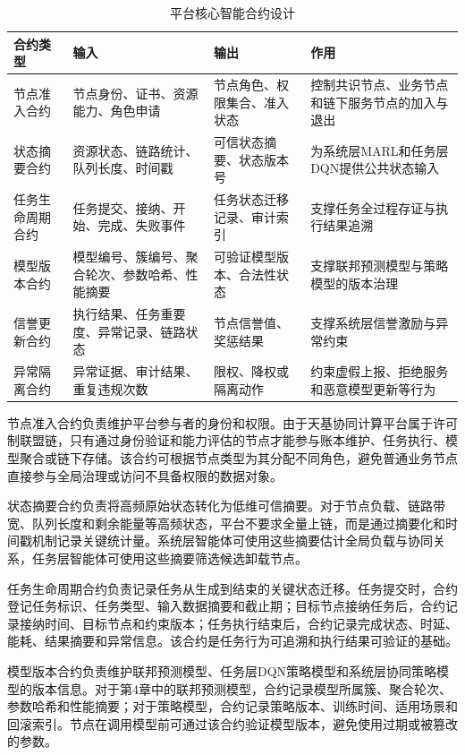 \begin{table}[htbp]
  \centering
  \caption{平台核心智能合约设计}
  \label{tab:contract_design}
  \begin{tabular}{p{2.5cm}p{3.4cm}p{3.5cm}p{3.5cm}}
    \toprule
    合约类型 & 输入 & 输出 & 作用 \\
    \midrule
    节点准入合约 & 节点身份、证书、资源能力、角色申请 & 节点角色、权限集合、准入状态 & 控制共识节点、业务节点和链下服务节点的加入与退出 \\
    状态摘要合约 & 资源状态、链路统计、队列长度、时间戳 & 可信状态摘要、状态版本号 & 为系统层MARL和任务层DQN提供公共状态输入 \\
    任务生命周期合约 & 任务提交、接纳、开始、完成、失败事件 & 任务状态迁移记录、审计索引 & 支撑任务全过程存证与执行结果追溯 \\
    模型版本合约 & 模型编号、簇编号、聚合轮次、参数哈希、性能摘要 & 可验证模型版本、合法性状态 & 支撑联邦预测模型与策略模型的版本治理 \\
    信誉更新合约 & 执行结果、任务重要度、异常记录、链路状态 & 节点信誉值、奖惩结果 & 支撑系统层信誉激励与异常约束 \\
    异常隔离合约 & 异常证据、审计结果、重复违规次数 & 限权、降权或隔离动作 & 约束虚假上报、拒绝服务和恶意模型更新等行为 \\
    \bottomrule
  \end{tabular}
\end{table}

节点准入合约负责维护平台参与者的身份和权限。由于天基协同计算平台属于许可制联盟链，只有通过身份验证和能力评估的节点才能参与账本维护、任务执行、模型聚合或链下存储。该合约可根据节点类型为其分配不同角色，避免普通业务节点直接参与全局治理或访问不具备权限的数据对象。

状态摘要合约负责将高频原始状态转化为低维可信摘要。对于节点负载、链路带宽、队列长度和剩余能量等高频状态，平台不要求全量上链，而是通过摘要化和时间戳机制记录关键统计量。系统层智能体可使用这些摘要估计全局负载与协同关系，任务层智能体可使用这些摘要筛选候选卸载节点。

任务生命周期合约负责记录任务从生成到结束的关键状态迁移。任务提交时，合约登记任务标识、任务类型、输入数据摘要和截止期；目标节点接纳任务后，合约记录接纳时间、目标节点和约束版本；任务执行结束后，合约记录完成状态、时延、能耗、结果摘要和异常信息。该合约是任务行为可追溯和执行结果可验证的基础。

模型版本合约负责维护联邦预测模型、任务层DQN策略模型和系统层协同策略模型的版本信息。对于第4章中的联邦预测模型，合约记录模型所属簇、聚合轮次、参数哈希和性能摘要；对于策略模型，合约记录策略版本、训练时间、适用场景和回滚索引。节点在调用模型前可通过该合约验证模型版本，避免使用过期或被篡改的参数。

